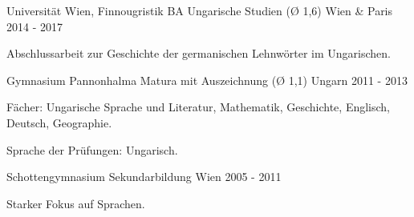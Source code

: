 \begin{cventries}
  \cventry
    {Universität Wien, Finnougristik} %
    {BA Ungarische Studien (Ø 1,6)} %
    {Wien \& Paris} %
    {2014 - 2017} %
    {
      \begin{cvitems} %
        \item {Abschlussarbeit zur Geschichte der germanischen Lehnwörter im Ungarischen.}
      \end{cvitems}
    }
        
  \cventry
    {Gymnasium Pannonhalma} %
    {Matura mit Auszeichnung (Ø 1,1)} %
    {Ungarn} %
    {2011 - 2013} %
    {
      \begin{cvitems} %
        \item {Fächer: Ungarische Sprache und Literatur, Mathematik, Geschichte, Englisch, Deutsch, Geographie.}
        \item{Sprache der Prüfungen: Ungarisch.}
      \end{cvitems}
    }

  \cventry    
    {Schottengymnasium} %
    {Sekundarbildung} %
    {Wien} %
    {2005 - 2011} %
    {
      \begin{cvitems} %
        \item {Starker Fokus auf Sprachen.}
      \end{cvitems}
    }
\end{cventries}
